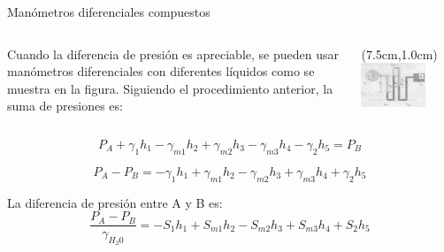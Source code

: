\documentclass [xcolor=svgnames, t] {beamer}
\begin{document}
\begin{frame}{Man\'ometros diferenciales compuestos}
\begin{columns}
Cuando la diferencia de presi\'on es apreciable, se pueden usar man\'ometros diferenciales con diferentes l\'iquidos como se muestra en la figura. Siguiendo el procedimiento anterior, la suma de presiones es:
\begin{textblock*}{7.5cm}(7.5cm,1.0cm) %
\includegraphics[width=0.7\textwidth]{manome3}
\end{textblock*}
\end{columns}
\vspace{1cm}
$$
P_A + \gamma_1 h_1 - \gamma_{m1} h_2 + \gamma_{m2} h_3 - \gamma_{m3} h_4 - \gamma_2 h_5 = P_B
$$
 
$$
P_A - P_B = -\gamma_1 h_1 + \gamma_{m1} h_2 - \gamma_{m2} h_3 + \gamma_{m3} h_4 + \gamma_2 h_5
$$

La diferencia de presi\'on entre A y B es:
$$
\frac{ P_A - P_B }{\gamma_{H_2 0}} = -S_1 h_1 + S_{m1} h_2 - S_{m2} h_3 + S_{m3} h_4 + S_2 h_5
$$

\end{frame}
\end{document}
